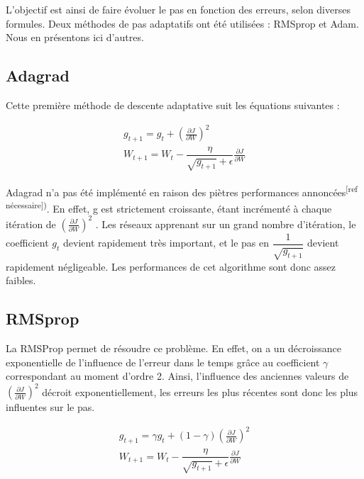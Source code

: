 L'objectif est ainsi de faire évoluer le pas en fonction des erreurs, selon diverses formules. Deux méthodes de pas adaptatifs ont été utilisées : RMSprop et Adam. Nous en présentons ici d'autres.

\subsection{Adagrad}

Cette première méthode de descente adaptative suit les équations suivantes :

\begin{equation}
\begin{aligned}
g_{t+1} = g_t + (\frac{\partial J}{\partial W})^2 \\
W_{t+1} = W_t - \dfrac{\eta}{\sqrt{g_{t+1}} + \epsilon}\frac{\partial J}{\partial W}
\end{aligned}
\end{equation} 

Adagrad n'a pas été implémenté en raison des piètres performances annoncées\textsuperscript{[ref nécessaire])}. En effet, g est strictement croissante, étant incrémenté à chaque itération de $(\frac{\partial J}{\partial W})^2$ . Les réseaux apprenant sur un grand nombre d'itération, le coefficient $g_{t}$ devient rapidement très important, et le pas en $\dfrac{1}{\sqrt{g_{t+1}}}$ devient rapidement négligeable. Les performances de cet algorithme sont donc assez faibles.

\subsection{RMSprop}

La RMSProp permet de résoudre ce problème. En effet, on a un décroissance exponentielle de l'influence de l'erreur dans le temps grâce au coefficient $\gamma$ correspondant au moment d'ordre 2. Ainsi, l'influence des anciennes valeurs de $(\frac{\partial J}{\partial W})^2$ décroit exponentiellement, les erreurs les plus récentes sont donc les plus influentes sur le pas.

\begin{equation} 
\begin{aligned}
g_{t+1} = \gamma g_t + (1-\gamma)(\frac{\partial J}{\partial W})^2 \\
W_{t+1} = W_t - \dfrac{\eta}{\sqrt{g_{t+1}} + \epsilon}\frac{\partial J}{\partial W}
\end{aligned}
\end{equation} 

